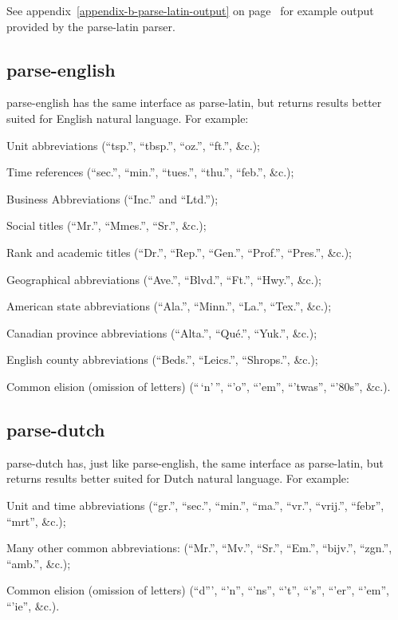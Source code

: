 See appendix~\ref{appendix-b-parse-latin-output} on
page~\pageref{appendix-b-parse-latin-output} for example output provided
by the parse-latin parser.

\subsection{parse-english}\label{parse-english}

parse-english has the same interface as parse-latin, but returns results
better suited for English natural language. For example:

\begin{aenumerate}
\item
  Unit abbreviations (``tsp.'', ``tbsp.'', ``oz.'', ``ft.'', \&c.);
\item
  Time references (``sec.'', ``min.'', ``tues.'', ``thu.'', ``feb.'',
  \&c.);
\item
  Business Abbreviations (``Inc.'' and ``Ltd.'');
\item
  Social titles (``Mr.'', ``Mmes.'', ``Sr.'', \&c.);
\item
  Rank and academic titles (``Dr.'', ``Rep.'', ``Gen.'', ``Prof.'',
  ``Pres.'', \&c.);
\item
  Geographical abbreviations (``Ave.'', ``Blvd.'', ``Ft.'', ``Hwy.'',
  \&c.);
\item
  American state abbreviations (``Ala.'', ``Minn.'', ``La.'', ``Tex.'',
  \&c.);
\item
  Canadian province abbreviations (``Alta.'', ``Qué.'', ``Yuk.'',
  \&c.);
\item
  English county abbreviations (``Beds.'', ``Leics.'', ``Shrops.'',
  \&c.);
\item
  Common elision (omission of letters) (``\,`n'\,'', ``'o'', ``'em'',
  ``'twas'', ``'80s'', \&c.).
\end{aenumerate}

\subsection{parse-dutch}\label{parse-dutch}

parse-dutch has, just like parse-english, the same interface as
parse-latin, but returns results better suited for Dutch natural
language. For example:

\begin{aenumerate}
\item
  Unit and time abbreviations (``gr.'', ``sec.'', ``min.'', ``ma.'',
  ``vr.'', ``vrij.'', ``febr'', ``mrt'', \&c.);
\item
  Many other common abbreviations: (``Mr.'', ``Mv.'', ``Sr.'', ``Em.'',
  ``bijv.'', ``zgn.'', ``amb.'', \&c.);
\item
  Common elision (omission of letters) (``d''', ``'n'', ``'ns'', ``'t'',
  ``'s'', ``'er'', ``'em'', ``'ie'', \&c.).
\end{aenumerate}

